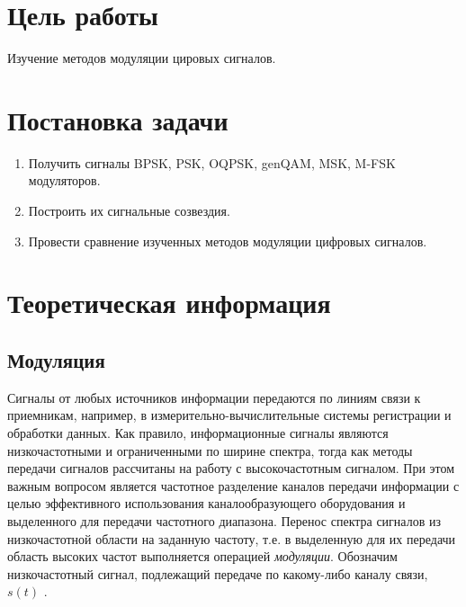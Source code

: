 

\setcounter{tocdepth}{3}






 
\section{Цель работы}
Изучение методов модуляции цировых сигналов.
 
\section{Постановка задачи}
\begin{enumerate}
\item Получить сигналы BPSK, PSK, OQPSK, genQAM, MSK, M-FSK модуляторов.
\item Построить их сигнальные созвездия.
\item Провести сравнение изученных методов модуляции цифровых сигналов.
\end{enumerate}


\section{Теоретическая информация}

\subsection{Модуляция}
Сигналы от любых источников информации передаются по линиям связи к приемникам, например, в измерительно-вычислительные системы регистрации и обработки данных. Как правило, информационные сигналы являются низкочастотными и ограниченными по ширине спектра, тогда как методы передачи сигналов рассчитаны на работу с высокочастотным сигналом. При этом важным вопросом является частотное разделение каналов передачи информации с целью эффективного использования каналообразующего оборудования и выделенного для передачи частотного диапазона. Перенос спектра сигналов из низкочастотной области на заданную частоту, т.е. в выделенную для их передачи область высоких частот выполняется операцией \textit{модуляции}. Обозначим низкочастотный сигнал, подлежащий передаче по какому-либо каналу связи, $s(t)$ .   

